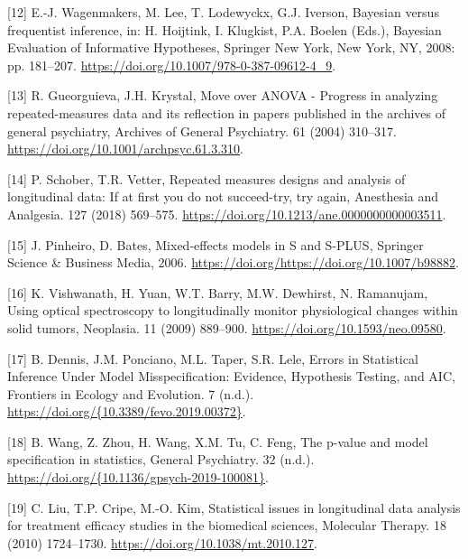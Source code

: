 \documentclass[
]{article}
\begin{document}
\leavevmode\hypertarget{ref-wagenmakers2008}{}%
{[}12{]} E.-J. Wagenmakers, M. Lee, T. Lodewyckx, G.J. Iverson, Bayesian versus frequentist inference, in: H. Hoijtink, I. Klugkist, P.A. Boelen (Eds.), Bayesian Evaluation of Informative Hypotheses, Springer New York, New York, NY, 2008: pp. 181--207. \url{https://doi.org/10.1007/978-0-387-09612-4_9}.

\leavevmode\hypertarget{ref-gueorguieva2004}{}%
{[}13{]} R. Gueorguieva, J.H. Krystal, Move over ANOVA - Progress in analyzing repeated-measures data and its reflection in papers published in the archives of general psychiatry, Archives of General Psychiatry. 61 (2004) 310--317. \url{https://doi.org/10.1001/archpsyc.61.3.310}.

\leavevmode\hypertarget{ref-schober2018}{}%
{[}14{]} P. Schober, T.R. Vetter, Repeated measures designs and analysis of longitudinal data: If at first you do not succeed-try, try again, Anesthesia and Analgesia. 127 (2018) 569--575. \url{https://doi.org/10.1213/ane.0000000000003511}.

\leavevmode\hypertarget{ref-pinheiro2006}{}%
{[}15{]} J. Pinheiro, D. Bates, Mixed-effects models in S and S-PLUS, Springer Science \& Business Media, 2006. \url{https://doi.org/https://doi.org/10.1007/b98882}.

\leavevmode\hypertarget{ref-vishwanath2009}{}%
{[}16{]} K. Vishwanath, H. Yuan, W.T. Barry, M.W. Dewhirst, N. Ramanujam, Using optical spectroscopy to longitudinally monitor physiological changes within solid tumors, Neoplasia. 11 (2009) 889--900. \url{https://doi.org/10.1593/neo.09580}.

\leavevmode\hypertarget{ref-dennis2019}{}%
{[}17{]} B. Dennis, J.M. Ponciano, M.L. Taper, S.R. Lele, Errors in Statistical Inference Under Model Misspecification: Evidence, Hypothesis Testing, and AIC, Frontiers in Ecology and Evolution. 7 (n.d.). \href{https://doi.org/\%7B10.3389/fevo.2019.00372\%7D}{https://doi.org/\{10.3389/fevo.2019.00372\}}.

\leavevmode\hypertarget{ref-wang2019}{}%
{[}18{]} B. Wang, Z. Zhou, H. Wang, X.M. Tu, C. Feng, The p-value and model specification in statistics, General Psychiatry. 32 (n.d.). \href{https://doi.org/\%7B10.1136/gpsych-2019-100081\%7D}{https://doi.org/\{10.1136/gpsych-2019-100081\}}.

\leavevmode\hypertarget{ref-liu2010}{}%
{[}19{]} C. Liu, T.P. Cripe, M.-O. Kim, Statistical issues in longitudinal data analysis for treatment efficacy studies in the biomedical sciences, Molecular Therapy. 18 (2010) 1724--1730. \url{https://doi.org/10.1038/mt.2010.127}.
\end{document}

